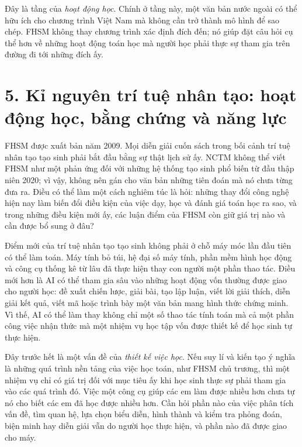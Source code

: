 Đây là tầng của \emph{hoạt động học}. Chính ở tầng này, một văn bản nước ngoài có thể hữu ích cho chương trình Việt Nam mà không cần trở thành mô hình để sao chép. FHSM không thay chương trình xác định đích đến; nó giúp đặt câu hỏi cụ thể hơn về những hoạt động toán học mà người học phải thực sự tham gia trên đường đi tới những đích ấy.

{}
\section*{5. Kỉ nguyên trí tuệ nhân tạo: hoạt động học, bằng chứng và năng lực}

FHSM được xuất bản năm 2009. Mọi diễn giải cuốn sách trong bối cảnh trí tuệ nhân tạo tạo sinh phải bắt đầu bằng sự thật lịch sử ấy. NCTM không thể viết FHSM như một phản ứng đối với những hệ thống tạo sinh phổ biến từ đầu thập niên 2020; vì vậy, không nên gán cho văn bản những tiên đoán mà nó chưa từng đưa ra. Điều có thể làm một cách nghiêm túc là hỏi: những thay đổi công nghệ hiện nay làm biến đổi điều kiện của việc dạy, học và đánh giá toán học ra sao, và trong những điều kiện mới ấy, các luận điểm của FHSM còn giữ giá trị nào và cần được bổ sung ở đâu?

Điểm mới của trí tuệ nhân tạo tạo sinh không phải ở chỗ máy móc lần đầu tiên có thể làm toán. Máy tính bỏ túi, hệ đại số máy tính, phần mềm hình học động và công cụ thống kê từ lâu đã thực hiện thay con người một phần thao tác. Điều mới hơn là AI có thể tham gia sâu vào những hoạt động vốn thường được giao cho người học: đề xuất chiến lược, giải bài, tạo lập luận, viết lời giải thích,
diễn giải kết quả, viết mã hoặc trình bày một văn bản mang hình thức chứng minh. Vì thế, AI có thể làm thay không chỉ một số thao tác tính toán mà cả một phần công việc nhận thức mà một nhiệm vụ học tập vốn được thiết kế để học sinh tự thực hiện.

Đây trước hết là một vấn đề của \emph{thiết kế việc học}. Nếu suy lí và kiến tạo ý nghĩa là những quá trình nền tảng của việc học toán, như FHSM chủ trương, thì một nhiệm vụ chỉ có giá trị đối với mục tiêu ấy khi học sinh thực sự phải tham gia vào các quá trình đó. Việc một công cụ giúp các em làm được nhiều hơn chưa tự nó cho biết các em đã học được nhiều hơn. Cần hỏi phần nào của việc phân tích vấn đề, tìm quan hệ, lựa chọn biểu diễn, hình thành và kiểm tra phỏng đoán, biện minh hay diễn giải vẫn do người học thực hiện, và phần nào đã được giao cho máy.

